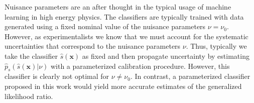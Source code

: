 \documentclass[12pt]{article}
\numberwithin{equation}{section}
\theoremstyle{plain}
\begin{document}




Nuisance parameters are an after thought in the typical usage of machine
learning in high energy physics. The classifiers are typically trained with
data generated using a fixed nominal value of the nuisance parameters $\nu=\nu_0$.
However, as experimentalists we know that we must account for
the systematic uncertainties that correspond to the nuisance parameters
$\nu$. Thus, typically we take the classifier $\hat s(\mathbf{x})$ as fixed and then propagate
uncertainty by estimating $\hat{p}_s(\hat s(\mathbf{x}) | \nu)$ with a parameterized calibration procedure.
However, this classifier is clearly not optimal
for $\nu \ne \nu_0$. In contrast, a parameterized classifier proposed in this work
would yield more accurate estimates of the generalized likelihood ratio.
\end{document}

